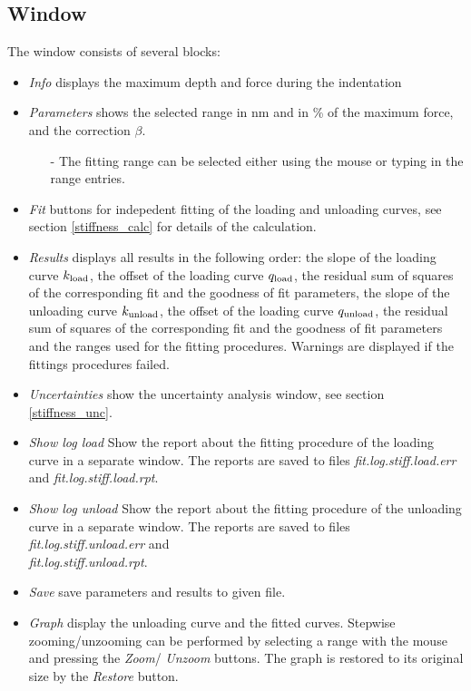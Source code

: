 \subsection{Window}
The window consists of several blocks:
\begin{itemize}
 \item \emph{Info} displays the maximum depth and force during the indentation
 \item \emph{Parameters} shows the selected range in nm and in \% of the maximum force, and the correction $\beta$. 
        \begin{itemize}
          \item[-] The fitting range can be selected either using the mouse or typing in the range entries.   
        \end{itemize}
 \item \emph{Fit} buttons for indepedent fitting of the loading and unloading curves, see section \ref{stiffness_calc} for details of the calculation.
 \item \emph{Results} displays all results in the following order: 
       the slope of the loading curve $k_{\mathrm{load}}$, the offset of the loading curve $q_{\mathrm{load}}$, 
       the residual sum of squares of the corresponding fit and the goodness of fit parameters,
       the slope of the unloading curve $k_{\mathrm{unload}}$, the offset of the loading curve $q_{\mathrm{unload}}$,
        the residual sum of squares of the corresponding fit and the goodness of fit parameters
       and the ranges used for the fitting procedures.
       Warnings are displayed if the fittings procedures failed.
 \item \emph{Uncertainties} show the uncertainty analysis window, see section \ref{stiffness_unc}.
 \item \emph{Show log load} Show the report about the fitting procedure of the loading curve in a separate window.  The reports are saved to files \emph{fit.log.stiff.load.err} and \emph{fit.log.stiff.load.rpt}. 
 \item \emph{Show log unload} Show the report about the fitting procedure of the unloading curve in a separate window.  The reports are saved to files \emph{fit.log.stiff.unload.err} and \\ \emph{fit.log.stiff.unload.rpt}. 
 \item \emph{Save} save parameters and results to given file. 
 \item \emph{Graph} display the unloading curve and the fitted curves. Stepwise zooming/unzooming can be performed by selecting a range with the mouse and pressing the \emph{Zoom}/ \emph{Unzoom} buttons. The graph is restored to its original size by the \emph{Restore} button.
\end{itemize}


